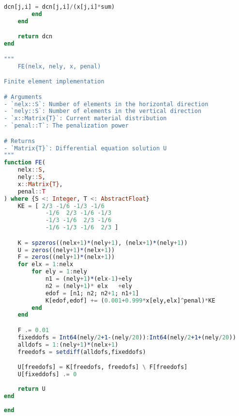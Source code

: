 \begin{lstlisting}[language=Julia, title=\texttt{toph.jl}]
        dcn[j,i] = dcn[j,i]/(x[j,i]*sum)
        end
    end

    return dcn
end

"""
    FE(nelx, nely, x, penal)

Finite element implementation

# Arguments
- `nelx::S`: Number of elements in the horizontal direction
- `nely::S`: Number of elements in the vertical direction
- `x::Matrix{T}`: Current material distribution
- `penal::T`: The penalization power

# Returns
- `Matrix{T}`: Differential equation solution U
"""
function FE(
    nelx::S,
    nely::S,
    x::Matrix{T},
    penal::T
) where {S <: Integer, T <: AbstractFloat}
    KE = [ 2/3 -1/6 -1/3 -1/6
            -1/6  2/3 -1/6 -1/3
            -1/3 -1/6  2/3 -1/6
            -1/6 -1/3 -1/6  2/3 ]

    K = spzeros((nelx+1)*(nely+1), (nelx+1)*(nely+1))
    U = zeros((nely+1)*(nelx+1))
    F = zeros((nely+1)*(nelx+1))
    for elx = 1:nelx
        for ely = 1:nely 
            n1 = (nely+1)*(elx-1)+ely
            n2 = (nely+1)* elx   +ely
            edof = [n1; n2; n2+1; n1+1]
            K[edof,edof] += (0.001+0.999*x[ely,elx]^penal)*KE
        end
    end

    F .= 0.01
    fixeddofs = Int64(nely/2+1-(nely/20)):Int64(nely/2+1+(nely/20))
    alldofs = 1:(nely+1)*(nelx+1)
    freedofs = setdiff(alldofs,fixeddofs)

    U[freedofs] = K[freedofs, freedofs] \ F[freedofs]
    U[fixeddofs] .= 0
    
    return U
end
    
end
\end{lstlisting}